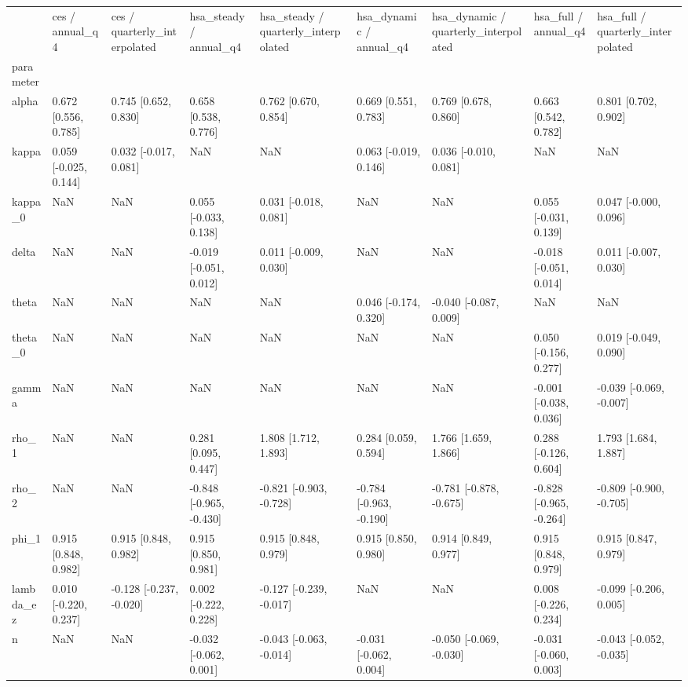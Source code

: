 \begin{tabular}{lllllllll}
\toprule
 & ces / annual\_q4 & ces / quarterly\_interpolated & hsa\_steady / annual\_q4 & hsa\_steady / quarterly\_interpolated & hsa\_dynamic / annual\_q4 & hsa\_dynamic / quarterly\_interpolated & hsa\_full / annual\_q4 & hsa\_full / quarterly\_interpolated \\
parameter &  &  &  &  &  &  &  &  \\
\midrule
alpha & 0.672 [0.556, 0.785] & 0.745 [0.652, 0.830] & 0.658 [0.538, 0.776] & 0.762 [0.670, 0.854] & 0.669 [0.551, 0.783] & 0.769 [0.678, 0.860] & 0.663 [0.542, 0.782] & 0.801 [0.702, 0.902] \\
kappa & 0.059 [-0.025, 0.144] & 0.032 [-0.017, 0.081] & NaN & NaN & 0.063 [-0.019, 0.146] & 0.036 [-0.010, 0.081] & NaN & NaN \\
kappa\_0 & NaN & NaN & 0.055 [-0.033, 0.138] & 0.031 [-0.018, 0.081] & NaN & NaN & 0.055 [-0.031, 0.139] & 0.047 [-0.000, 0.096] \\
delta & NaN & NaN & -0.019 [-0.051, 0.012] & 0.011 [-0.009, 0.030] & NaN & NaN & -0.018 [-0.051, 0.014] & 0.011 [-0.007, 0.030] \\
theta & NaN & NaN & NaN & NaN & 0.046 [-0.174, 0.320] & -0.040 [-0.087, 0.009] & NaN & NaN \\
theta\_0 & NaN & NaN & NaN & NaN & NaN & NaN & 0.050 [-0.156, 0.277] & 0.019 [-0.049, 0.090] \\
gamma & NaN & NaN & NaN & NaN & NaN & NaN & -0.001 [-0.038, 0.036] & -0.039 [-0.069, -0.007] \\
rho\_1 & NaN & NaN & 0.281 [0.095, 0.447] & 1.808 [1.712, 1.893] & 0.284 [0.059, 0.594] & 1.766 [1.659, 1.866] & 0.288 [-0.126, 0.604] & 1.793 [1.684, 1.887] \\
rho\_2 & NaN & NaN & -0.848 [-0.965, -0.430] & -0.821 [-0.903, -0.728] & -0.784 [-0.963, -0.190] & -0.781 [-0.878, -0.675] & -0.828 [-0.965, -0.264] & -0.809 [-0.900, -0.705] \\
phi\_1 & 0.915 [0.848, 0.982] & 0.915 [0.848, 0.982] & 0.915 [0.850, 0.981] & 0.915 [0.848, 0.979] & 0.915 [0.850, 0.980] & 0.914 [0.849, 0.977] & 0.915 [0.848, 0.979] & 0.915 [0.847, 0.979] \\
lambda\_ez & 0.010 [-0.220, 0.237] & -0.128 [-0.237, -0.020] & 0.002 [-0.222, 0.228] & -0.127 [-0.239, -0.017] & NaN & NaN & 0.008 [-0.226, 0.234] & -0.099 [-0.206, 0.005] \\
n & NaN & NaN & -0.032 [-0.062, 0.001] & -0.043 [-0.063, -0.014] & -0.031 [-0.062, 0.004] & -0.050 [-0.069, -0.030] & -0.031 [-0.060, 0.003] & -0.043 [-0.052, -0.035] \\
\bottomrule
\end{tabular}

